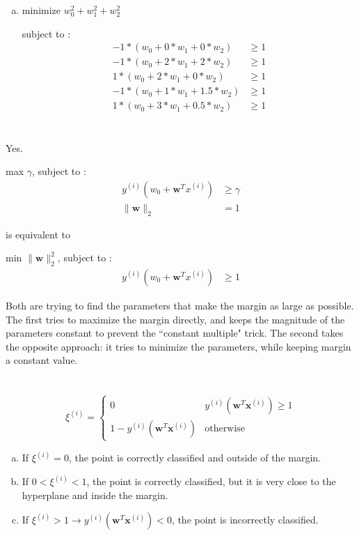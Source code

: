 \documentclass[12pt]{article}
\begin{document}
\begin{enumerate}[(a)]
		\item minimize $ w_0^2 + w_1^2 + w_2^2 $
		\par subject to :
		\begin{align*}
			-1 *(w_0 + 0 * w_1 + 0 * w_2) &\geq 1\\
			-1 *(w_0 + 2 * w_1 + 2 * w_2) &\geq 1\\
			1 *(w_0 + 2 * w_1 + 0 * w_2) &\geq 1\\
			-1 *(w_0 + 1 * w_1 + 1.5 * w_2) &\geq 1\\
			1 *(w_0 + 3 * w_1 + 0.5 * w_2) &\geq 1
		\end{align*}
\end{enumerate}
\newpage

\section{}
Yes. 
\par max $ \gamma $, subject to :
\begin{align*}
	y^{(i)}(w_0+\mathbf{w}^Tx^{(i)}) &\geq \gamma\\
	\|\mathbf{w}\|_{2} &= 1
\end{align*}

is equivalent to 
\par min $ \|\mathbf{w}\|_{2}^{2} $, subject to :
\begin{align*}
	y^{(i)}(w_0+\mathbf{w}^Tx^{(i)}) &\geq 1
\end{align*}
\par Both are trying to find the parameters that make the margin as large as possible. The first tries to maximize the margin directly, and keeps the magnitude of the parameters constant to prevent the ``constant multiple" trick. The second takes the opposite approach: it tries to minimize the parameters, while keeping margin a constant value.
\newpage

\section{}
\[ \xi^{(i)} =  \begin{cases}
	0 & y^{(i)}(\mathbf{w}^T\mathbf{x}^{(i)}) \geq 1\\
	1 - y^{(i)}(\mathbf{w}^T\mathbf{x}^{(i)}) & \text{otherwise}
\end{cases} \]
\begin{enumerate}[(a)]
	\item If $ \xi^{(i)} = 0$, the point is correctly classified and outside of the margin.
	
	\item If $ 0 < \xi^{(i)} < 1$, the point is correctly classified, but it is very close to the hyperplane and inside the margin.
	
	\item If $ \xi^{(i)} > 1 \rightarrow y^{(i)}(\mathbf{w}^T\mathbf{x}^{(i)}) < 0$, the point is incorrectly classified. 
\end{enumerate}
\newpage

\section{}

	
	
\end{document}
